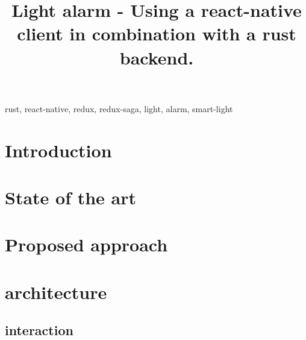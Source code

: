 \documentclass[conference]{IEEEtran}
\begin{document}
\title{Light alarm - Using a react-native client in combination with a rust backend.}

\author{
\and
{}
}

\maketitle

\begin{abstract}

\end{abstract}

\begin{IEEEkeywords}
rust, react-native, redux, redux-saga, light, alarm, smart-light
\end{IEEEkeywords}

\section{Introduction}

\section{State of the art}


\section{Proposed approach}


\section{architecture}

\subsection{interaction}
\end{document}
